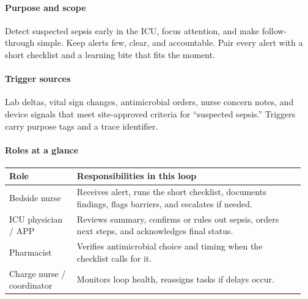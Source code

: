 \documentclass[12pt]{article}
\begin{document}
\paragraph{Purpose and scope}
Detect suspected sepsis early in the ICU, focus attention, and make follow-through simple. Keep alerts few, clear, and accountable. Pair every alert with a short checklist and a learning bite that fits the moment.

\paragraph{Trigger sources}
Lab deltas, vital sign changes, antimicrobial orders, nurse concern notes, and device signals that meet site-approved criteria for “suspected sepsis.” Triggers carry purpose tags and a trace identifier.

\paragraph{Roles at a glance}
\begin{longtable}{@{}p{0.22\linewidth}p{0.74\linewidth}@{}}
\toprule
\textbf{Role} & \textbf{Responsibilities in this loop} \\
\midrule
\endhead
Bedside nurse & Receives alert, runs the short checklist, documents findings, flags barriers, and escalates if needed. \\
ICU physician / APP & Reviews summary, confirms or rules out sepsis, orders next steps, and acknowledges final status. \\
Pharmacist & Verifies antimicrobial choice and timing when the checklist calls for it. \\
Charge nurse / coordinator & Monitors loop health, reassigns tasks if delays occur. \\
\bottomrule
\end{longtable}
\end{document}
